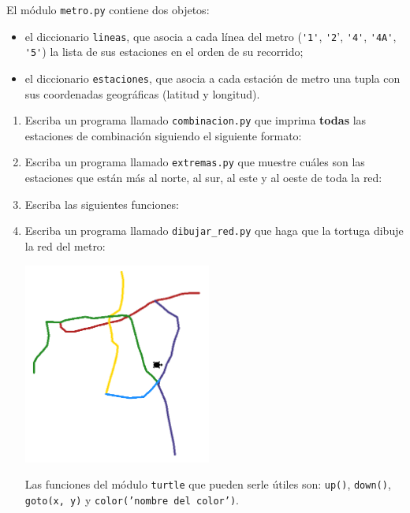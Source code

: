 El módulo \texttt{metro.py} contiene dos objetos:
\begin{itemize}[leftmargin=0pt]
  \item el diccionario \verb!lineas!,
    que asocia a cada línea del metro
    (\verb!'1'!, \verb!'2!', \verb!'4'!, \verb!'4A'!, \verb!'5'!)
    la lista de sus estaciones
    en el orden de su recorrido;
  \item el diccionario \verb!estaciones!,
    que asocia a cada estación de metro
    una tupla con sus coordenadas geográficas
    (latitud y longitud).
\end{itemize}

\begin{enumerate}[leftmargin=0pt,label=\emph{\alph*})]
  \item
    Escriba un programa llamado \texttt{combinacion.py}
    que imprima \textbf{todas} las estaciones de combinación
    siguiendo el siguiente formato:
    

  \item
    Escriba un programa llamado \texttt{extremas.py}
    que muestre cuáles son las estaciones que están
    más al norte, al sur, al este y al oeste
    de toda la red:
    

  \newpage
  \item
    Escriba las siguientes funciones:
    

  \newpage
  \item
    Escriba un programa llamado \verb!dibujar_red.py!
    que haga que la tortuga dibuje la red del metro:

    \includegraphics[height=250px]{metro/red1}

    Las funciones del módulo \texttt{turtle}
    que pueden serle útiles son:
    \texttt{up()},
    \texttt{down()},
    \texttt{goto(x, y)} y
    \texttt{color('nombre del color')}.


\end{enumerate}
